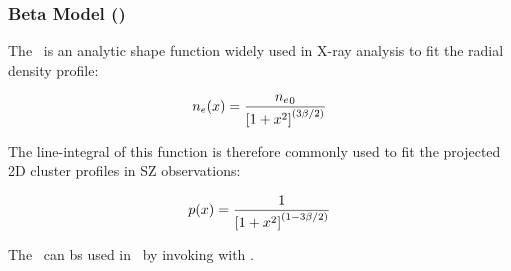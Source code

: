 \subsubsection{Beta Model (\betamodel)}

The \betamodel\ is an analytic shape function widely used in X-ray
analysis to fit the radial density profile:

\begin{equation}
n_e(x) = {{n_e}_0\over{\left[1 + x^2\right]^{(3\beta/2)}}}
\end{equation}

The line-integral of this function is therefore commonly used to fit the
projected 2D cluster profiles in SZ observations:

\begin{equation}
p(x) = {1\over{\left[1 + x^2\right]^{(1-3\beta/2)}}}
\end{equation}

The \betamodel\ can bs used in \climax\ by invoking 
with .

